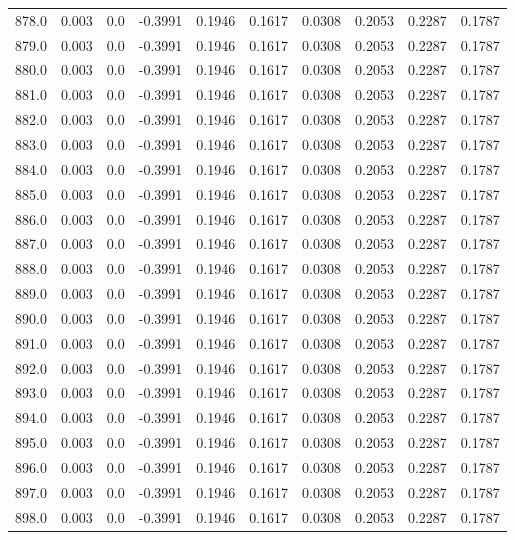 \begin{longtable}{lrrrrrrrrr}
878.0 & 0.003 & 0.0 & -0.3991 & 0.1946 & 0.1617 & 0.0308 & 0.2053 & 0.2287 & 0.1787 \\
879.0 & 0.003 & 0.0 & -0.3991 & 0.1946 & 0.1617 & 0.0308 & 0.2053 & 0.2287 & 0.1787 \\
880.0 & 0.003 & 0.0 & -0.3991 & 0.1946 & 0.1617 & 0.0308 & 0.2053 & 0.2287 & 0.1787 \\
881.0 & 0.003 & 0.0 & -0.3991 & 0.1946 & 0.1617 & 0.0308 & 0.2053 & 0.2287 & 0.1787 \\
882.0 & 0.003 & 0.0 & -0.3991 & 0.1946 & 0.1617 & 0.0308 & 0.2053 & 0.2287 & 0.1787 \\
883.0 & 0.003 & 0.0 & -0.3991 & 0.1946 & 0.1617 & 0.0308 & 0.2053 & 0.2287 & 0.1787 \\
884.0 & 0.003 & 0.0 & -0.3991 & 0.1946 & 0.1617 & 0.0308 & 0.2053 & 0.2287 & 0.1787 \\
885.0 & 0.003 & 0.0 & -0.3991 & 0.1946 & 0.1617 & 0.0308 & 0.2053 & 0.2287 & 0.1787 \\
886.0 & 0.003 & 0.0 & -0.3991 & 0.1946 & 0.1617 & 0.0308 & 0.2053 & 0.2287 & 0.1787 \\
887.0 & 0.003 & 0.0 & -0.3991 & 0.1946 & 0.1617 & 0.0308 & 0.2053 & 0.2287 & 0.1787 \\
888.0 & 0.003 & 0.0 & -0.3991 & 0.1946 & 0.1617 & 0.0308 & 0.2053 & 0.2287 & 0.1787 \\
889.0 & 0.003 & 0.0 & -0.3991 & 0.1946 & 0.1617 & 0.0308 & 0.2053 & 0.2287 & 0.1787 \\
890.0 & 0.003 & 0.0 & -0.3991 & 0.1946 & 0.1617 & 0.0308 & 0.2053 & 0.2287 & 0.1787 \\
891.0 & 0.003 & 0.0 & -0.3991 & 0.1946 & 0.1617 & 0.0308 & 0.2053 & 0.2287 & 0.1787 \\
892.0 & 0.003 & 0.0 & -0.3991 & 0.1946 & 0.1617 & 0.0308 & 0.2053 & 0.2287 & 0.1787 \\
893.0 & 0.003 & 0.0 & -0.3991 & 0.1946 & 0.1617 & 0.0308 & 0.2053 & 0.2287 & 0.1787 \\
894.0 & 0.003 & 0.0 & -0.3991 & 0.1946 & 0.1617 & 0.0308 & 0.2053 & 0.2287 & 0.1787 \\
895.0 & 0.003 & 0.0 & -0.3991 & 0.1946 & 0.1617 & 0.0308 & 0.2053 & 0.2287 & 0.1787 \\
896.0 & 0.003 & 0.0 & -0.3991 & 0.1946 & 0.1617 & 0.0308 & 0.2053 & 0.2287 & 0.1787 \\
897.0 & 0.003 & 0.0 & -0.3991 & 0.1946 & 0.1617 & 0.0308 & 0.2053 & 0.2287 & 0.1787 \\
898.0 & 0.003 & 0.0 & -0.3991 & 0.1946 & 0.1617 & 0.0308 & 0.2053 & 0.2287 & 0.1787 \\

\end{longtable}
